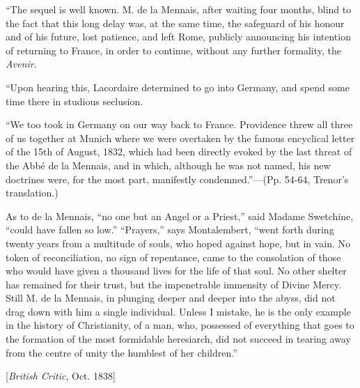 ``The sequel is well known. M. de la Mennais,
after waiting four months, blind to the fact that this long delay was,
at the same time, the safeguard of his honour and of his future, lost
patience, and left Rome, publicly announcing his intention of
returning to France, in order to continue, without any further
formality, the \emph{Avenir}.

``Upon hearing this, Lacordaire determined to go
into Germany, and spend some time there in studious seclusion.

``We too took in Germany on our way back to
France. Providence threw all three of us together at Munich where we were overtaken by the famous encyclical letter of the 15th of
August, 1832, which had been directly evoked by the last threat of the
Abbé de la Mennais, and in which, although he was not named, his new
doctrines were, for the most part, manifestly condemned.''—(Pp.
54-64, Trenor's translation.)

As to de la Mennais, ``no one but an Angel or a
Priest,'' said Madame Swetchine, ``could have fallen so low.'' ``Prayers,''
says Montalembert, ``went forth during twenty years from a multitude of
souls, who hoped against hope, but in vain. No token of
reconciliation, no sign of repentance, came to the consolation of
those who would have given a thousand lives for the life of that soul.
No other shelter has remained for their trust, but the impenetrable
immensity of Divine Mercy. Still M. de la Mennais, in plunging deeper
and deeper into the abyss, did not drag down with him a single
individual. Unless I mistake, he is the only example in the history of
Christianity, of a man, who, possessed of everything that goes to the
formation of the most formidable heresiarch, did not succeed in
tearing away from the centre of unity the humblest of her children.''


[\emph{British Critic}, Oct. 1838]

